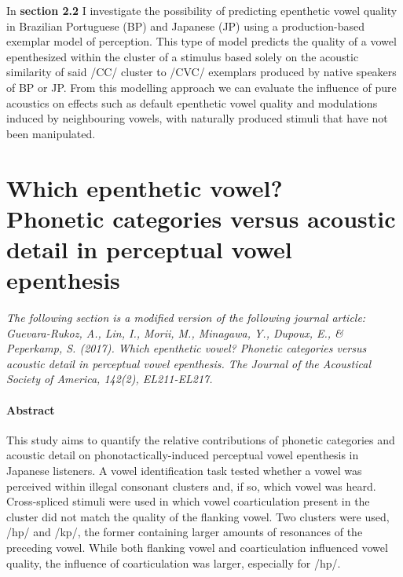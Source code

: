 {In \textbf{section 2.2} I investigate the possibility of predicting epenthetic vowel quality in Brazilian Portuguese (BP) and Japanese (JP) using a production-based exemplar model of perception. This type of model predicts the quality of a vowel epenthesized within the cluster of a stimulus based solely on the acoustic similarity of said /CC/ cluster to /CVC/ exemplars produced by native speakers of BP or JP. From this modelling approach we can evaluate the influence of pure acoustics on effects such as default epenthetic vowel quality and modulations induced by neighbouring vowels, with naturally produced stimuli that have not been manipulated.}


% 

\newpage
\section{Which epenthetic vowel? \\ Phonetic categories versus acoustic detail in perceptual vowel epenthesis}


\textit{{\color{blue}The following section is a modified version of the following journal article: \\
Guevara-Rukoz, A., Lin, I., Morii, M., Minagawa, Y., Dupoux, E., \& Peperkamp, S. (2017). Which epenthetic vowel? Phonetic categories versus acoustic detail in perceptual vowel epenthesis. The Journal of the Acoustical Society of America, 142(2), EL211-EL217.}}

\paragraph{Abstract}

This study aims to quantify the relative contributions of phonetic categories and acoustic detail on phonotactically-induced perceptual vowel epenthesis in Japanese listeners. A vowel identification task tested whether a vowel was perceived within illegal consonant clusters and, if so, which vowel was heard. Cross-spliced stimuli were used in which vowel coarticulation present in the cluster did not match the quality of the flanking vowel. Two clusters were used, /hp/ and /kp/, the former containing larger amounts of resonances of the preceding vowel. While both flanking vowel and coarticulation influenced vowel quality, the influence of coarticulation was larger, especially for /hp/.

